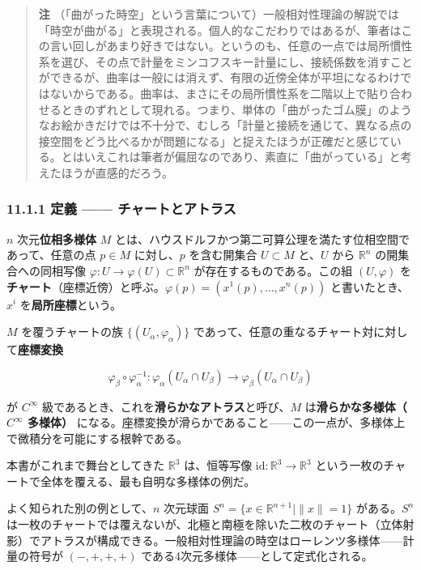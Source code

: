 \documentclass[a4paper,12pt,openany]{book}
\begin{document}
\begin{quote}
\textbf{注}
（「曲がった時空」という言葉について）一般相対性理論の解説では「時空が曲がる」と表現される。個人的なこだわりではあるが、筆者はこの言い回しがあまり好きではない。というのも、任意の一点では局所慣性系を選び、その点で計量をミンコフスキー計量にし、接続係数を消すことができるが、曲率は一般には消えず、有限の近傍全体が平坦になるわけではないからである。曲率は、まさにその局所慣性系を二階以上で貼り合わせるときのずれとして現れる。つまり、単体の「曲がったゴム膜」のようなお絵かきだけでは不十分で、むしろ「計量と接続を通じて、異なる点の接空間をどう比べるかが問題になる」と捉えたほうが正確だと感じている。とはいえこれは筆者が偏屈なのであり、素直に「曲がっている」と考えたほうが直感的だろう。
\end{quote}

\hypertarget{ux5b9aux7fa9-ux30c1ux30e3ux30fcux30c8ux3068ux30a2ux30c8ux30e9ux30b9}{%
\subsubsection{11.1.1 定義 ——
チャートとアトラス}\label{ux5b9aux7fa9-ux30c1ux30e3ux30fcux30c8ux3068ux30a2ux30c8ux30e9ux30b9}}

\(n\) 次元\textbf{位相多様体} \(M\)
とは、ハウスドルフかつ第二可算公理を満たす位相空間であって、任意の点
\(p \in M\) に対し、\(p\) を含む開集合 \(U \subset M\) と、\(U\) から
\(\mathbb{R}^n\) の開集合への同相写像
\(\varphi: U \to \varphi(U) \subset \mathbb{R}^n\)
が存在するものである。この組 \((U, \varphi)\)
を\textbf{チャート}（座標近傍）と呼ぶ。\(\varphi(p) = (x^1(p), \dots, x^n(p))\)
と書いたとき、\(x^i\) を\textbf{局所座標}という。

\(M\) を覆うチャートの族 \(\{(U_\alpha, \varphi_\alpha)\}\)
であって、任意の重なるチャート対に対して\textbf{座標変換}

\[\varphi_\beta \circ \varphi_\alpha^{-1}: \varphi_\alpha(U_\alpha \cap U_\beta) \to \varphi_\beta(U_\alpha \cap U_\beta)\]

が \(C^\infty\)
級であるとき、これを\textbf{滑らかなアトラス}と呼び、\(M\)
は\textbf{滑らかな多様体（$C^\infty$ 多様体）}
になる。座標変換が滑らかであること——この一点が、多様体上で微積分を可能にする根幹である。

本書がこれまで舞台としてきた \(\mathbb{R}^3\) は、恒等写像
\(\mathrm{id}: \mathbb{R}^3 \to \mathbb{R}^3\)
という一枚のチャートで全体を覆える、最も自明な多様体の例だ。

よく知られた別の例として、\(n\) 次元球面
\(S^n = \{x \in \mathbb{R}^{n+1} \mid \|x\| = 1\}\) がある。\(S^n\)
は一枚のチャートでは覆えないが、北極と南極を除いた二枚のチャート（立体射影）でアトラスが構成できる。一般相対性理論の時空はローレンツ多様体——計量の符号が
\((-,+,+,+)\) である4次元多様体——として定式化される。
\end{document}
